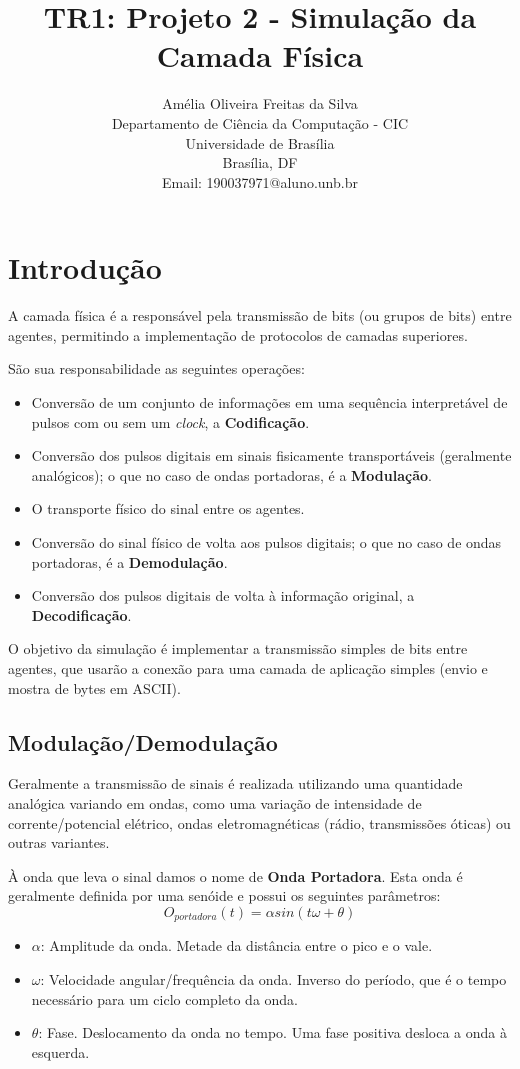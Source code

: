 \documentclass[titlepage,twocolumn]{article}
\title{TR1: Projeto 2 - Simulação da Camada Física}
\author
{Amélia Oliveira Freitas da Silva\\
Departamento de Ciência da Computação - CIC\\
Universidade de Brasília\\
Brasília, DF\\
Email: 190037971@aluno.unb.br
}
\begin{document}
\begin{titlepage}
    \maketitle
\end{titlepage}

\section{Introdução}

A camada física é a responsável pela transmissão de bits (ou grupos de bits) entre agentes, permitindo a implementação de protocolos de camadas superiores.

São sua responsabilidade as seguintes operações:

\begin{itemize}
    \item Conversão de um conjunto de informações em uma se\-quên\-cia interpretável de pulsos com ou sem um \textit{clock}, a \textbf{Codificação}.
    \item Conversão dos pulsos digitais em sinais fisicamente transportáveis (geralmente analógicos); o que no caso de ondas portadoras, é a \textbf{Modulação}.
    \item O transporte físico do sinal entre os a\-gen\-tes.
    \item Conversão do sinal físico de volta aos pulsos digitais; o que no caso de ondas portadoras, é a \textbf{Demodulação}.
    \item Conversão dos pulsos digitais de volta à informação original, a \textbf{Decodificação}.
\end{itemize}

O objetivo da simulação é implementar a transmissão simples de bits entre agentes, que usarão a conexão para uma camada de aplicação simples (envio e mostra de bytes em ASCII).

\subsection{Modulação/Demodulação}
\label{sec:modemod}
Geralmente a transmissão de sinais é realizada utilizando uma quantidade analógica variando em ondas, como uma variação de intensidade de corrente/potencial elétrico, ondas eletromagnéticas (rádio, transmissões óticas) ou outras variantes.

À onda que leva o sinal damos o nome de \textbf{Onda Portadora}. Esta onda é geralmente definida por uma senóide e possui os seguintes parâmetros:
\[ O_{portadora}(t) = \alpha sin(t\omega+\theta) \]
\begin{itemize}
    \item $\alpha$: Amplitude da onda. Metade da distância entre o pico e o vale.
    \item $\omega$: Velocidade angular/frequência da onda. Inverso do período, que é o tempo necessário para um ciclo completo da onda.
    \item $\theta$: Fase. Deslocamento da onda no tempo. Uma fase positiva desloca a onda à esquerda.
\end{itemize}
\end{document}
